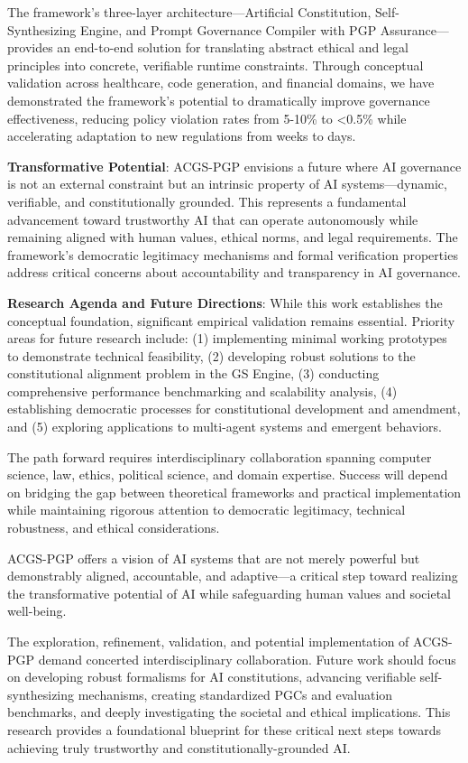 \documentclass[sigconf,review,anonymous=false]{acmart} %
\begin{document}
The framework's three-layer architecture—Artificial Constitution, Self-Synthesizing Engine, and Prompt Governance Compiler with PGP Assurance—provides an end-to-end solution for translating abstract ethical and legal principles into concrete, verifiable runtime constraints. Through conceptual validation across healthcare, code generation, and financial domains, we have demonstrated the framework's potential to dramatically improve governance effectiveness, reducing policy violation rates from 5-10\% to <0.5\% while accelerating adaptation to new regulations from weeks to days.

\textbf{Transformative Potential}: ACGS-PGP envisions a future where AI governance is not an external constraint but an intrinsic property of AI systems—dynamic, verifiable, and constitutionally grounded. This represents a fundamental advancement toward trustworthy AI that can operate autonomously while remaining aligned with human values, ethical norms, and legal requirements. The framework's democratic legitimacy mechanisms and formal verification properties address critical concerns about accountability and transparency in AI governance.

\textbf{Research Agenda and Future Directions}: While this work establishes the conceptual foundation, significant empirical validation remains essential. Priority areas for future research include: (1) implementing minimal working prototypes to demonstrate technical feasibility, (2) developing robust solutions to the constitutional alignment problem in the GS Engine, (3) conducting comprehensive performance benchmarking and scalability analysis, (4) establishing democratic processes for constitutional development and amendment, and (5) exploring applications to multi-agent systems and emergent behaviors.

The path forward requires interdisciplinary collaboration spanning computer science, law, ethics, political science, and domain expertise. Success will depend on bridging the gap between theoretical frameworks and practical implementation while maintaining rigorous attention to democratic legitimacy, technical robustness, and ethical considerations.

ACGS-PGP offers a vision of AI systems that are not merely powerful but demonstrably aligned, accountable, and adaptive—a critical step toward realizing the transformative potential of AI while safeguarding human values and societal well-being.

The exploration, refinement, validation, and potential implementation of ACGS-PGP demand concerted interdisciplinary collaboration. Future work should focus on developing robust formalisms for AI constitutions, advancing verifiable self-synthesizing mechanisms, creating standardized PGCs and evaluation benchmarks, and deeply investigating the societal and ethical implications. This research provides a foundational blueprint for these critical next steps towards achieving truly trustworthy and constitutionally-grounded AI.
\end{document}
